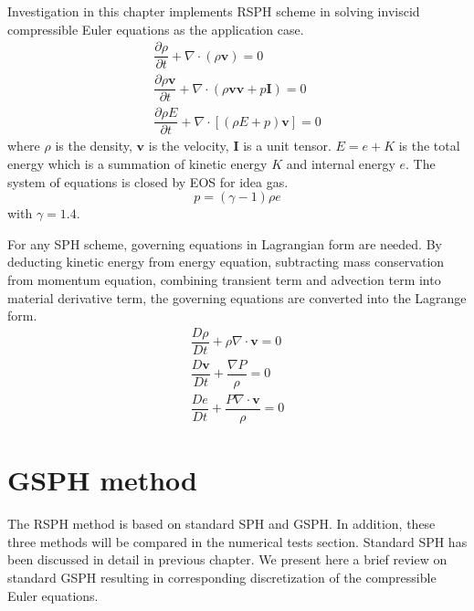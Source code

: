 Investigation in this chapter implements RSPH scheme in solving inviscid compressible Euler equations as the application case.  
\begin{align}
\dfrac{\partial \rho}{\partial t} + \nabla \cdot \left(\rho \textbf{v} \right) = 0 \label{eq:gov-cs-rho-er} \\
\dfrac{\partial \rho \textbf{v}}{\partial t} + \nabla \cdot \left(\rho \textbf{v} \textbf{v} + p\textbf{I}\right) = 0 \label{eq:gov-cs-v-er} \\
\dfrac{\partial \rho E}{\partial t} + \nabla \cdot \left[\left(\rho E + p \right)\textbf{v}\right] = 0 \label{eq:gov-cs-e-er}
\end{align}
where $\rho$ is the density, $\textbf{v}$ is the velocity, $\textbf{I}$ is a unit tensor.
$E = e + K $ is the total energy which is a summation of kinetic energy $K$ and internal energy $e$.
The system of equations is closed by EOS for idea gas.
\begin{equation}
p = \left(\gamma - 1\right)\rho e \label{eq:EOS-er}
\end{equation}
with $\gamma=1.4$.

For any SPH scheme, governing equations in Lagrangian form are needed. By deducting kinetic energy from energy equation, subtracting mass conservation from momentum equation, combining transient term and advection term into material derivative term, the governing equations are converted into the Lagrange form. 
\begin{align}
\dfrac{D \rho}{D t} + \rho \nabla \cdot \textbf{v} = 0 \label{eq:gov-nc-rho-er}\\
\dfrac{D \textbf{v}}{D t} + \dfrac{\nabla P}{\rho} =0 \label{eq:gov-nc-v-er}\\
\dfrac{D e}{D t} + \dfrac{P \nabla \cdot \textbf{v}}{\rho} = 0 \label{eq:gov-nc-e-er}
\end{align}

\section{GSPH method} \label{sec:GSPH-method}
The RSPH method is based on standard SPH and GSPH. In addition, these three methods will be compared in the numerical tests section. Standard SPH has been discussed in detail in previous chapter. We present here a brief review on standard GSPH resulting in corresponding discretization of the compressible Euler equations.
 
